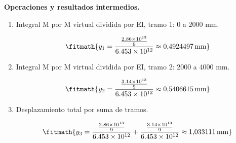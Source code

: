 \noindent\textbf{Operaciones y resultados intermedios.}

\begin{enumerate}

\item Integral M por M virtual dividida por EI, tramo 1: 0 a 2000 mm.

\[\fitmath{y_{1}=\frac{\frac{2.86\times10^{13}}{9}}{6.453\times10^{12}}\approx 0{,}4924497\,\mathrm{mm}}\]

\item Integral M por M virtual dividida por EI, tramo 2: 2000 a 4000 mm.

\[\fitmath{y_{2}=\frac{\frac{3.14\times10^{13}}{9}}{6.453\times10^{12}}\approx 0{,}5406615\,\mathrm{mm}}\]

\item Desplazamiento total por suma de tramos.

\[\fitmath{y_{3}=\frac{\frac{2.86\times10^{13}}{9}}{6.453\times10^{12}}+\frac{\frac{3.14\times10^{13}}{9}}{6.453\times10^{12}}\approx 1{,}033111\,\mathrm{mm}}\]

\end{enumerate}
